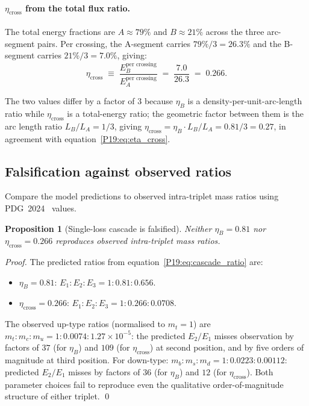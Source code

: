 \documentclass[11pt,a4paper]{article}
\newtheorem{proposition}[theorem]{Proposition}
\theoremstyle{definition}\newtheorem{definition}[theorem]{Definition}
\theoremstyle{remark}
\begin{document}
\paragraph{$\eta_{\mathrm{cross}}$ from the total flux ratio.} The
total energy fractions are $A\approx 79\%$ and $B\approx 21\%$
across the three arc-segment pairs.  Per crossing, the A-segment
carries $79\%/3=26.3\%$ and the B-segment carries $21\%/3=7.0\%$,
giving:
\begin{equation}
  \eta_{\mathrm{cross}} \;\equiv\; \frac{E_B^{\text{per crossing}}}
  {E_A^{\text{per crossing}}}
  \;=\; \frac{7.0}{26.3} \;=\; 0.266.
  \label{P19:eq:eta_cross}
\end{equation}

The two values differ by a factor of $3$ because $\eta_B$ is a
density-per-unit-arc-length ratio while $\eta_{\mathrm{cross}}$ is
a total-energy ratio; the geometric factor between them is the arc
length ratio $L_B/L_A=1/3$, giving
$\eta_{\mathrm{cross}}=\eta_B\cdot L_B/L_A=0.81/3=0.27$, in
agreement with equation~\eqref{P19:eq:eta_cross}.

\subsection{Falsification against observed ratios}

Compare the model predictions to observed intra-triplet mass ratios
using PDG~2024~\cite{PDG2024} values.

\begin{proposition}[Single-loss cascade is falsified]
\label{P19:prop:cascade_falsified}
Neither $\eta_B=0.81$ nor $\eta_{\mathrm{cross}}=0.266$
reproduces observed intra-triplet mass ratios.
\end{proposition}

\begin{proof}
The predicted ratios from equation~\eqref{P19:eq:cascade_ratio} are:
\begin{itemize}[noitemsep]
\item $\eta_B=0.81$: $E_1:E_2:E_3 = 1:0.81:0.656$.
\item $\eta_{\mathrm{cross}}=0.266$: $E_1:E_2:E_3 = 1:0.266:0.0708$.
\end{itemize}
The observed up-type ratios (normalised to $m_t=1$) are
$m_t:m_c:m_u = 1:0.0074:1.27\times 10^{-5}$: the predicted
$E_2/E_1$ misses observation by factors of $37$ (for $\eta_B$)
and $109$ (for $\eta_{\mathrm{cross}}$) at second position, and
by five orders of magnitude at third position.
For down-type: $m_b:m_s:m_d = 1:0.0223:0.00112$: predicted
$E_2/E_1$ misses by factors of $36$ (for $\eta_B$) and $12$ (for
$\eta_{\mathrm{cross}}$).  Both parameter choices fail to
reproduce even the qualitative order-of-magnitude structure of
either triplet.
\qed
\end{proof}
\end{document}
